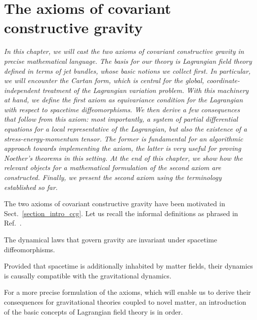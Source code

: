 \chapter{The axioms of covariant constructive gravity}\label{chapter_axioms}
\textit{In this chapter, we will cast the two axioms of covariant constructive gravity in precise mathematical language. The basis for our theory is Lagrangian field theory defined in terms of jet bundles, whose basic notions we collect first. In particular, we will encounter the Cartan form, which is central for the global, coordinate-independent treatment of the Lagrangian variation problem. With this machinery at hand, we define the first axiom as equivariance condition for the Lagrangian with respect to spacetime diffeomorphisms. We then derive a few consequences that follow from this axiom: most importantly, a system of partial differential equations for a local representative of the Lagrangian, but also the existence of a stress-energy-momentum tensor. The former is fundamental for an algorithmic approach towards implementing the axiom, the latter is very useful for proving Noether's theorems in this setting. At the end of this chapter, we show how the relevant objects for a mathematical formulation of the second axiom are constructed. Finally, we present the second axiom using the terminology established so far.}

The two axioms of covariant constructive gravity have been motivated in Sect.\ \ref{section_intro_ccg}. Let us recall the informal definitions as phrased in Ref.\ \cite{Alex_2020}.

\begin{axiom}
  The dynamical laws that govern gravity are invariant under spacetime diffeomorphisms.
\end{axiom}
\begin{axiom}
  Provided that spacetime is additionally inhabited by matter fields, their dynamics is causally compatible with the gravitational dynamics.
\end{axiom}

For a more precise formulation of the axioms, which will enable us to derive their consequences for gravitational theories coupled to novel matter, an introduction of the basic concepts of Lagrangian field theory is in order.

